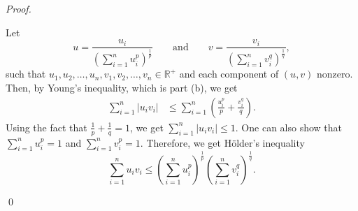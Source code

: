 \documentclass[12pt]{article}
\newenvironment{problem}[2][Problem]{\begin{trivlist}
\item[\hskip \labelsep {\bfseries #1}\hskip \labelsep {\bfseries
#2.}]}{\end{trivlist}}
\newenvironment{sol}
    {\emph{Proof.}
    }
    {
    \qed
    }
\begin{document}
\begin{problem}{25}
\begin{itemize}
      \begin{sol}
      Let $$u = \frac{u_i}{\left( \sum_{i = 1}^n u_i^p \right)^{\frac{1}{p}}} \hspace{2em} \text{and} \hspace{2em} v = \frac{v_i}{\left( \sum_{i = 1}^n v_i^q \right)^{\frac{1}{q}}},$$ such that $u_1,u_2,\dots,u_n,v_1,v_2,\dots,v_n \in \mathbb{R}^+$ and each component of $(u,v)$ nonzero. Then, by Young's inequality, which is part (b), we get
      \begin{align*}
          \sum_{i = 1}^n \left| u_iv_i \right| &\leq \sum_{i = 1}^n \left( \frac{u_i^p}{p} + \frac{v_i^q}{q} \right).
      \end{align*}
      Using the fact that $\frac{1}{p} + \frac{1}{q} = 1$, we get $\sum_{i = 1}^n \left| u_iv_i \right| \leq 1$. One can also show that $\sum_{i = 1}^nu_i^p = 1$ and $\sum_{i = 1}^nv_i^p = 1$. Therefore, we get H\"older's inequality $$\sum_{i = 1}^nu_iv_i \leq \left( \sum_{i = 1}^n u_i^p \right)^{\frac{1}{p}} \left( \sum_{i = 1}^n v_i^q \right)^{\frac{1}{q}}.$$
      \end{sol}
  \end{itemize}
  \end{problem}
  
\end{document}
